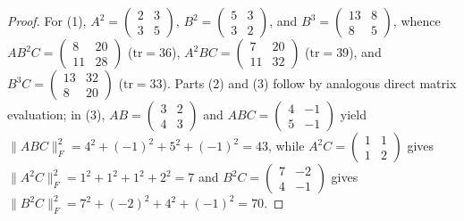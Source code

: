 \documentclass[11pt,a4paper]{article}
\theoremstyle{definition}
\theoremstyle{remark}
\newcommand{\tr}{\mathrm{tr}}
\begin{document}
\begin{proof}
For (1), $A^2 = \begin{pmatrix} 2 & 3 \\ 3 & 5 \end{pmatrix}$, $B^2 = \begin{pmatrix} 5 & 3 \\ 3 & 2 \end{pmatrix}$, and $B^3 = \begin{pmatrix} 13 & 8 \\ 8 & 5 \end{pmatrix}$, whence $A B^2 C = \begin{pmatrix} 8 & 20 \\ 11 & 28 \end{pmatrix}$ ($\tr = 36$), $A^2 B C = \begin{pmatrix} 7 & 20 \\ 11 & 32 \end{pmatrix}$ ($\tr = 39$), and $B^3 C = \begin{pmatrix} 13 & 32 \\ 8 & 20 \end{pmatrix}$ ($\tr = 33$). Parts (2) and (3) follow by analogous direct matrix evaluation; in (3), $AB = \begin{pmatrix} 3 & 2 \\ 4 & 3 \end{pmatrix}$ and $ABC = \begin{pmatrix} 4 & -1 \\ 5 & -1 \end{pmatrix}$ yield $\|ABC\|_F^2 = 4^2 + (-1)^2 + 5^2 + (-1)^2 = 43$, while $A^2 C = \begin{pmatrix} 1 & 1 \\ 1 & 2 \end{pmatrix}$ gives $\|A^2 C\|_F^2 = 1^2 + 1^2 + 1^2 + 2^2 = 7$ and $B^2 C = \begin{pmatrix} 7 & -2 \\ 4 & -1 \end{pmatrix}$ gives $\|B^2 C\|_F^2 = 7^2 + (-2)^2 + 4^2 + (-1)^2 = 70$.
\end{proof}
\end{document}
